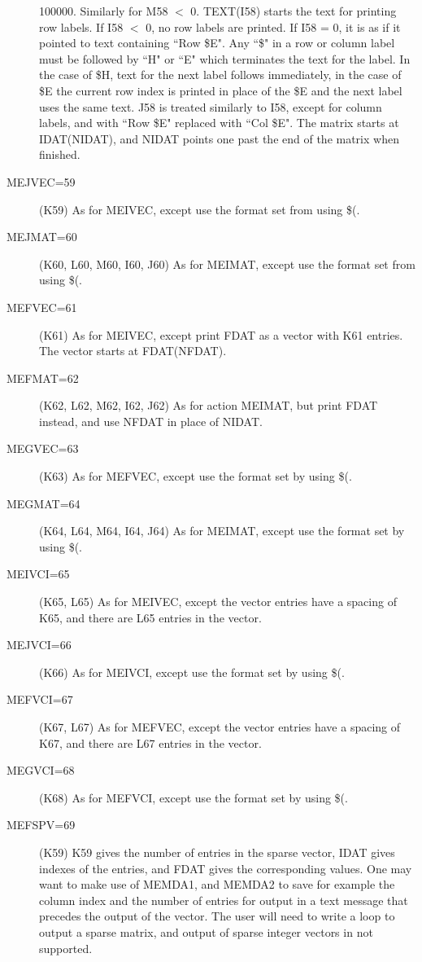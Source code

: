 \documentclass[twoside]{MATH77}
\begin{document}
\begin{description}
           100000.  Similarly for M58 $<$ 0. TEXT(I58) starts the text for
           printing row labels.  If I58 $<$ 0, no row labels are
           printed.  If I58 = 0, it is as if it pointed to text
           containing ``Row \$E".  Any ``\$" in a row or column label must
           be followed by ``H" or ``E" which terminates the text for the
           label.  In the case of \$H, text for the next label follows
           immediately, in the case of \$E the current row index is
           printed in place of the \$E and the next label uses the same
           text.  J58 is treated similarly to I58, except for column
           labels, and with ``Row \$E" replaced with ``Col \$E".  The
           matrix starts at IDAT(NIDAT), and NIDAT points one past the
           end of the matrix when finished.
\item[MEJVEC=59]  (K59) As for MEIVEC, except use the format set from
           using \$(.
\item[MEJMAT=60]  (K60, L60, M60, I60, J60) As for MEIMAT, except use the
           format set from using \$(.
\item[MEFVEC=61]  (K61) As for MEIVEC, except print FDAT as a vector with
           K61 entries.  The vector starts at FDAT(NFDAT).
\item[MEFMAT=62]  (K62, L62, M62, I62, J62) As for action MEIMAT, but
           print FDAT instead, and use NFDAT in place of NIDAT.
\item[MEGVEC=63]  (K63) As for MEFVEC, except use the format set by using \$(.
\item[MEGMAT=64]  (K64, L64, M64, I64, J64) As for MEIMAT, except use the
           format set by using \$(.
\item[MEIVCI=65]  (K65, L65) As for MEIVEC, except the vector entries have a
           spacing of K65, and there are L65 entries in the vector.
\item[MEJVCI=66]  (K66) As for MEIVCI, except use the format set by
           using \$(.
\item[MEFVCI=67]  (K67, L67) As for MEFVEC, except the vector entries have a
           spacing of K67, and there are L67 entries in the vector.
\item[MEGVCI=68]  (K68) As for MEFVCI, except use the format set by
           using \$(.
\item[MEFSPV=69] (K59)  K59 gives the number of entries in the sparse
  vector, IDAT gives indexes of the entries, and FDAT gives the
  corresponding values.  One may want to make use of MEMDA1, and
  MEMDA2 to save for example the column index and the number of
  entries for output in a text message that precedes the output of the
  vector.  The user will need to write a loop to output a sparse
  matrix, and output of sparse integer vectors in not supported.
\end{description}
\end{document}
